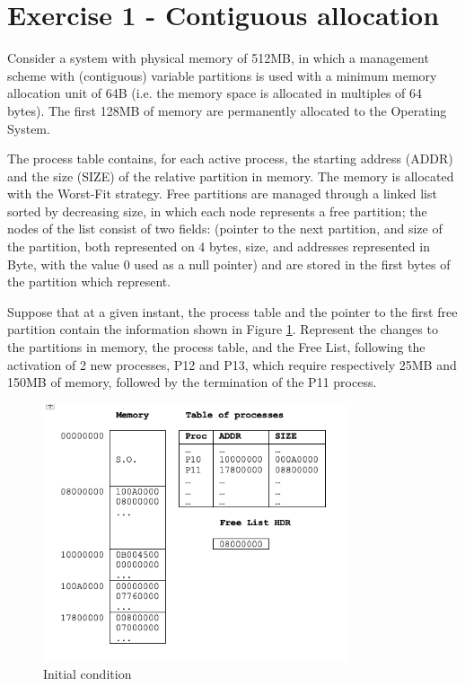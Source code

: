 \section{Exercise 1 - Contiguous allocation}

Consider a system with physical memory of 512MB, in which a management scheme with (contiguous) variable partitions is used with a minimum memory allocation unit of 64B (i.e. the memory space is allocated in multiples of 64 bytes). 
The first 128MB of memory are permanently allocated to the Operating System.

The process table contains, for each active process, the starting address (ADDR) and the size (SIZE) of the relative partition in memory. The memory is allocated with the Worst-Fit strategy. Free partitions are managed through a linked list sorted by decreasing size, in which each node represents a free partition; the nodes of the list consist of two fields: (pointer to the next partition, and size of the partition, both represented on 4 bytes, size, and addresses represented in Byte, with the value 0 used as a null pointer) and are stored in the first bytes of the partition which represent.

Suppose that at a given instant, the process table and the pointer to the first free partition contain the information shown in Figure \ref{fig:cont1}. Represent the changes to the partitions in memory, the process table, and the Free List, following the activation of 2 new processes, P12 and P13, which require respectively 25MB and 150MB of memory, followed by the termination of the P11 process.

\begin{figure}[hbt]
  \includegraphics[width=0.8\textwidth]{images/contiguosallocation1.png}
  \caption{Initial condition}
  \label{fig:cont1}
\end{figure}

